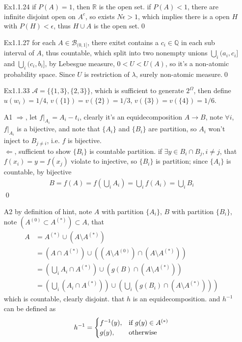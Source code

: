 \documentclass[paper=a4, fontsize=11pt]{scrartcl} %
\numberwithin{equation}{section} %
\numberwithin{figure}{section} %
\numberwithin{table}{section} %
\begin{document}
\begin{itemize}
	\item[Ex1.1.24] if $P(A)=1$, then $\mathbb{R}$ is the open set. if $P(A)<1$, there are infinite disjoint open on $A^c$, so exists $N\epsilon>1$, which implies there is a open $H$ with $P(H)<\epsilon$, thus $H\cup A$ is the open set.\qed
	\item[Ex1.1.27] for each $A\in \mathcal{B}_{(0,1]}$, there exitst contains a $c_i\in \mathbb{Q}$ in each sub interval of $A$, thus countable, which split into two nonempty unions $\bigcup_i(a_i,c_i]$ and $\bigcup_i (c_i,b_i]$, by Lebesgue measure, $0<U<U(A)$, so it's a non-atomic probability space. Since $U$ is restriction of $\lambda$, surely non-atomic measure.\qed
	\item[Ex1.1.33] $\mathcal{A}=\{\{1,3\},\{2,3\}\}$, which is sufficient to generate $2^\Omega$, then define $u(w_i)=1/4$, $v(\{1\})=v(\{2\})=1/3$, $v(\{3\})=v(\{4\})=1/6$.
	\item[A1] $\Rightarrow$, let $f|_{A_i} = A_i - t_i$, clearly it's an equidecomposition $A\rightarrow B$, note $\forall i$, $f|_{A_i}$ is a bijective, and note that $\{A_i\}$ and $\{B_i\}$ are partition, so $A_i$ won't inject to $B_{j\neq i}$, i.e. $f$ is bijective.\\
	$\Leftarrow$, sufficient to show $\{B_i\}$ is countable partition. if $\exists y \in B_i \cap B_j,i\neq j$, that $f(x_i)=y=f(x_j)$ violate to injective, so $\{B_i\}$ is partition; since $\{A_i\}$ is countable, by bijective
	\begin{align}
		B = f(A) = f(\bigcup_i A_i) = \bigcup_i f(A_i) = \bigcup_i B_i
	\end{align}\qed
	 \item[A2] by definition of hint, note $A$ with partition $\{A_i\}$, $B$ with partition $\{B_i\}$, note $(A^{(0)}\subset A^{(*)})\subset A$, that 
	 \begin{align}
	 	A &= A^{(*)} \cup (A\setminus A^{(*)})\\
	 		&= (A\cap A^{(*)}) \cup ((A\setminus A^{(0)}) \cap (A\setminus A^{(*)}))\\
	 		&= (\bigcup_i A_i \cap A^{(*)}) \cup (g(B)\cap (A\setminus A^{(*)}))\\
	 		&= (\bigcup_i(A_i\cap A^{(*)})) \cup (\bigcup_i(g(B_i) \cap (A\setminus A^{(*)})))
	 \end{align}
	 which is countable, clearly disjoint. that $h$ is an equidecomposition. and $h^{-1}$ can be defined as
	 \begin{align}
	 	h^{-1} = \begin{cases} f^{-1}(y), &\mbox{if $ g(y)\in A^{(*)}$}\\ g(y), &\mbox{otherwise} \end{cases}

\end{align}
\end{itemize}
\end{document}
